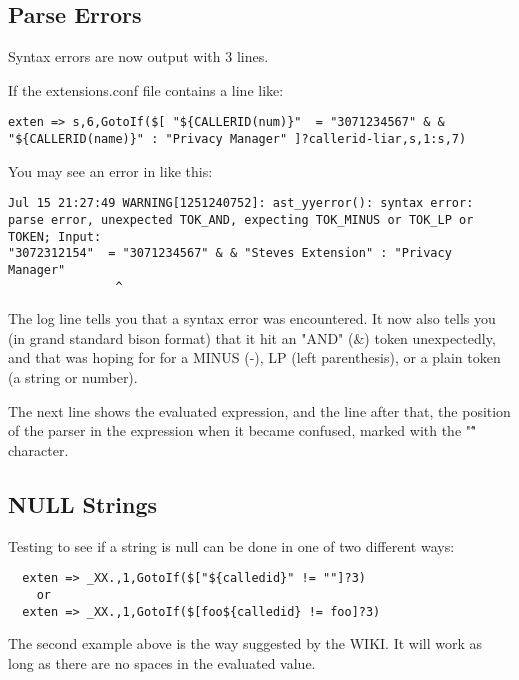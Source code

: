 \subsection{Parse Errors}

Syntax errors are now output with 3 lines.

If the extensions.conf file contains a line like:

\begin{astlisting}
\begin{verbatim}
exten => s,6,GotoIf($[ "${CALLERID(num)}"  = "3071234567" & &  "${CALLERID(name)}" : "Privacy Manager" ]?callerid-liar,s,1:s,7)
\end{verbatim}
\end{astlisting}

You may see an error in  like this:
\begin{astlisting}
\begin{verbatim}
Jul 15 21:27:49 WARNING[1251240752]: ast_yyerror(): syntax error: parse error, unexpected TOK_AND, expecting TOK_MINUS or TOK_LP or TOKEN; Input:
"3072312154"  = "3071234567" & & "Steves Extension" : "Privacy Manager"
               ^
\end{verbatim}
\end{astlisting}

The log line tells you that a syntax error was encountered. It now
also tells you (in grand standard bison format) that it hit an "AND"
(\&) token unexpectedly, and that was hoping for for a MINUS (-), LP
(left parenthesis), or a plain token (a string or number).

The next line shows the evaluated expression, and the line after
that, the position of the parser in the expression when it became confused,
marked with the "\^" character.

\subsection{NULL Strings}
Testing to see if a string is null can be done in one of two different ways:
\begin{astlisting}
\begin{verbatim}
  exten => _XX.,1,GotoIf($["${calledid}" != ""]?3)
    or
  exten => _XX.,1,GotoIf($[foo${calledid} != foo]?3)
\end{verbatim}
\end{astlisting}

The second example above is the way suggested by the WIKI. It will
work as long as there are no spaces in the evaluated value.

